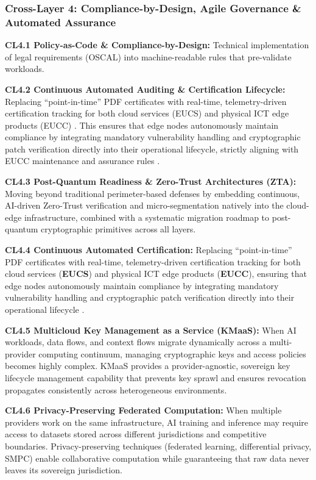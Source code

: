 \documentclass[12pt,a4paper]{article}
\begin{document}
\subsubsection*{Cross-Layer 4: Compliance-by-Design, Agile Governance \& Automated Assurance}
\textbf{CL4.1 Policy-as-Code \& Compliance-by-Design:} Technical implementation of legal requirements (OSCAL) into machine-readable rules that pre-validate workloads.

\textbf{CL4.2 Continuous Automated Auditing \& Certification Lifecycle:} Replacing ``point-in-time''  PDF certificates with real-time, telemetry-driven certification tracking for both cloud services (EUCS) \cite{eucs} and physical ICT edge products (EUCC) \cite{eucc}. This ensures that edge nodes autonomously maintain compliance by integrating mandatory vulnerability handling and cryptographic patch verification directly into their operational lifecycle, strictly aligning with EUCC maintenance and assurance rules \cite{eucc}.

\textbf{CL4.3 Post-Quantum Readiness \& Zero-Trust Architectures (ZTA):} Moving beyond traditional perimeter-based defenses by embedding continuous, AI-driven Zero-Trust verification and micro-segmentation natively into the cloud-edge infrastructure, combined with a systematic migration roadmap to post-quantum cryptographic primitives across all layers.

\textbf{CL4.4 Continuous Automated Certification:} Replacing ``point-in-time'' PDF certificates with real-time, telemetry-driven certification tracking for both cloud services (\textbf{EUCS}) and physical ICT edge products (\textbf{EUCC}), ensuring that edge nodes autonomously maintain compliance by integrating mandatory vulnerability handling and cryptographic patch verification directly into their operational lifecycle \cite{eucc}.

\textbf{CL4.5 Multicloud Key Management as a Service (KMaaS):} When AI workloads, data flows, and context flows migrate dynamically across a multi-provider computing continuum, managing cryptographic keys and access policies becomes highly complex. KMaaS provides a provider-agnostic, sovereign key lifecycle management capability that prevents key sprawl and ensures revocation propagates consistently across heterogeneous environments.

\textbf{CL4.6 Privacy-Preserving Federated Computation:} When multiple providers work on the same infrastructure, AI training and inference may require access to datasets stored across different jurisdictions and competitive boundaries. Privacy-preserving techniques (federated learning, differential privacy, SMPC) enable collaborative computation while guaranteeing that raw data never leaves its sovereign jurisdiction.
\end{document}
